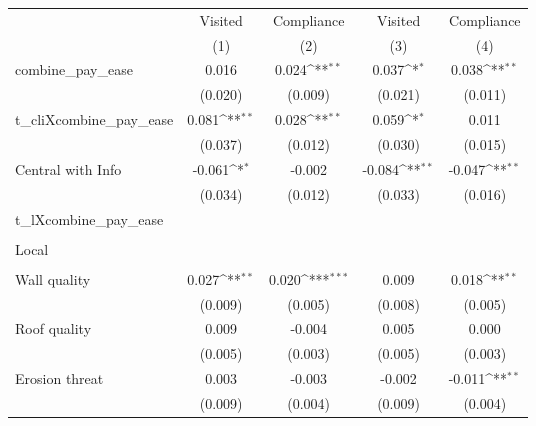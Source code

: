 {
\def\sym#1{\ifmmode^{#1}\else\(^{#1}\)\fi}
\begin{tabular}{l*{4}{c}}
\hline\hline
                &\multicolumn{1}{c}{Visited}&\multicolumn{1}{c}{Compliance}&\multicolumn{1}{c}{Visited}&\multicolumn{1}{c}{Compliance}\\
                &\multicolumn{1}{c}{(1)}         &\multicolumn{1}{c}{(2)}         &\multicolumn{1}{c}{(3)}         &\multicolumn{1}{c}{(4)}         \\
\hline
combine\_pay\_ease&    0.016         &    0.024\sym{**} &    0.037\sym{*}  &    0.038\sym{**} \\
                &  (0.020)         &  (0.009)         &  (0.021)         &  (0.011)         \\
t\_cliXcombine\_pay\_ease&    0.081\sym{**} &    0.028\sym{**} &    0.059\sym{*}  &    0.011         \\
                &  (0.037)         &  (0.012)         &  (0.030)         &  (0.015)         \\
Central with Info&   -0.061\sym{*}  &   -0.002         &   -0.084\sym{**} &   -0.047\sym{**} \\
                &  (0.034)         &  (0.012)         &  (0.033)         &  (0.016)         \\
t\_lXcombine\_pay\_ease&                  &                  &                  &                  \\
                &                  &                  &                  &                  \\
Local           &                  &                  &                  &                  \\
                &                  &                  &                  &                  \\
Wall quality    &    0.027\sym{**} &    0.020\sym{***}&    0.009         &    0.018\sym{**} \\
                &  (0.009)         &  (0.005)         &  (0.008)         &  (0.005)         \\
Roof quality    &    0.009         &   -0.004         &    0.005         &    0.000         \\
                &  (0.005)         &  (0.003)         &  (0.005)         &  (0.003)         \\
Erosion threat  &    0.003         &   -0.003         &   -0.002         &   -0.011\sym{**} \\
                &  (0.009)         &  (0.004)         &  (0.009)         &  (0.004)         \\

\end{tabular}}

